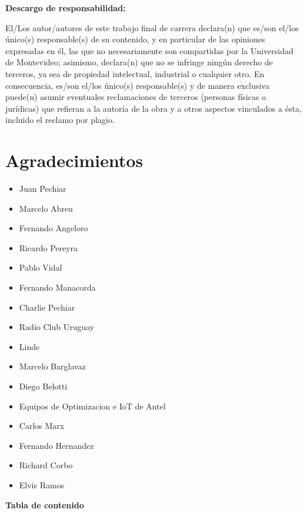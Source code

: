 \documentclass[12pt,a4paper]{article}
\begin{document}
\newpage
\textbf{Descargo de responsabilidad:}

El/Los autor/autores de este trabajo final de carrera declara(n) que es/son el/los único(s) responsable(s) de su contenido, y en particular de las opiniones expresadas en él, las que no necesariamente son compartidas por la Universidad de Montevideo; asimismo, declara(n) que no se infringe ningún derecho de terceros, ya sea de propiedad intelectual, industrial o cualquier otro. En consecuencia, es/son el/los único(s) responsable(s) y de manera exclusiva puede(n) asumir eventuales reclamaciones de terceros (personas físicas o jurídicas) que refieran a la autoría de la obra y a otros aspectos vinculados a ésta, incluido el reclamo por plagio.

\newpage
\section*{Agradecimientos}
\begingroup\raggedright
\begin{itemize}
\item Juan Pechiar
\item Marcelo Abreu
\item Fernando Angeloro
\item Ricardo Pereyra
\item Pablo Vidal 
\item Fernando Manacorda 
\item Charlie Pechiar
\item Radio Club Uruguay
\item Linde 
\item Marcelo Barglavaz 
\item Diego Belotti 
\item Equipos de Optimizacion e IoT de Antel
\item Carlos Marx
\item Fernando Hernandez 
\item Richard Corbo 
\item Elvis Ramos
\end{itemize}\endgroup

\newpage
\begin{center}
{\Large\bfseries Tabla de contenido\par}
\end{center}
\vspace{0.5em}
\tableofcontents
\end{document}
